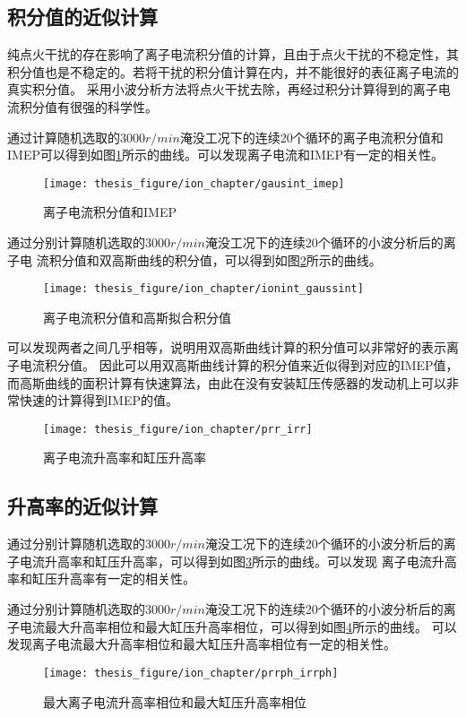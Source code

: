 \subsection{积分值的近似计算}
纯点火干扰的存在影响了离子电流积分值的计算，且由于点火干扰的不稳定性，其积分值也是不稳定的。若将干扰的积分值计算在内，并不能很好的表征离子电流的真实积分值。
采用小波分析方法将点火干扰去除，再经过积分计算得到的离子电流积分值有很强的科学性。\par
通过计算随机选取的$3000r/min$淹没工况下的连续20个循环的离子电流积分值和IMEP可以得到如图\ref{fig:integer_imep}所示的曲线。可以发现离子电流和IMEP有一定的相关性。\par
\begin{figure}[htb]
	\centering
	\texttt{[image: thesis\_figure/ion\_chapter/gausint\_imep]}
	\caption{\label{fig:integer_imep}离子电流积分值和IMEP}
\end{figure}
通过分别计算随机选取的$3000r/min$淹没工况下的连续20个循环的小波分析后的离子电
流积分值和双高斯曲线的积分值，可以得到如图\ref{fig:ionint_gaussint}所示的曲线。
\begin{figure}[htb]
	\centering
	\texttt{[image: thesis\_figure/ion\_chapter/ionint\_gaussint]}
	\caption{\label{fig:ionint_gaussint}离子电流积分值和高斯拟合积分值}
\end{figure}
可以发现两者之间几乎相等，说明用双高斯曲线计算的积分值可以非常好的表示离子电流积分值。
因此可以用双高斯曲线计算的积分值来近似得到对应的IMEP值，而高斯曲线的面积计算有快速算法，由此在没有安装缸压传感器的发动机上可以非常快速的计算得到IMEP的值。
\begin{figure}[htb]
	\centering
	\texttt{[image: thesis\_figure/ion\_chapter/prr\_irr]}
	\caption{\label{fig:prr_irr}离子电流升高率和缸压升高率}
\end{figure}
\subsection{升高率的近似计算}
通过分别计算随机选取的$3000r/min$淹没工况下的连续20个循环的小波分析后的离子电流升高率和缸压升高率，可以得到如图\ref{fig:prr_irr}所示的曲线。可以发现
离子电流升高率和缸压升高率有一定的相关性。\par
通过分别计算随机选取的$3000r/min$淹没工况下的连续20个循环的小波分析后的离子电流最大升高率相位和最大缸压升高率相位，可以得到如图\ref{fig:prrph_irrph}所示的曲线。
可以发现离子电流最大升高率相位和最大缸压升高率相位有一定的相关性。
\begin{figure}[htb]
	\centering
	\texttt{[image: thesis\_figure/ion\_chapter/prrph\_irrph]}
	\caption{\label{fig:prrph_irrph}最大离子电流升高率相位和最大缸压升高率相位}
\end{figure}
